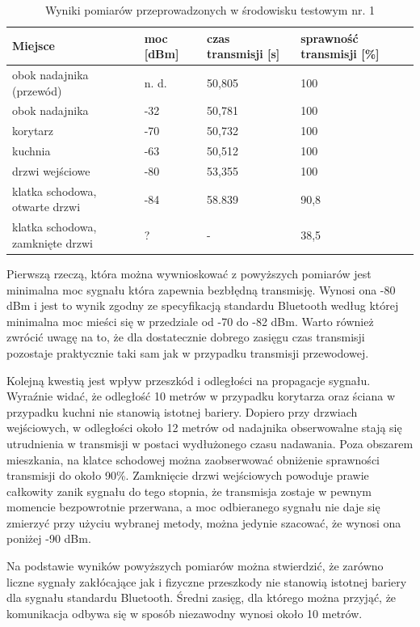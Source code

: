 \documentclass[12pt, twoside, openany]{mwrep}
\begin{document}
\begin{table}[H]
\centering
\begin{tabular}{|l|l|l|l|}
\hline
Miejsce                          & moc {[}dBm{]} & czas transmisji {[}s{]} & sprawność transmisji {[}\%{]} \\ \hline
obok nadajnika (przewód)         & n. d.         & 50,805                  & 100                           \\ \hline
obok nadajnika                   & -32           & 50,781                  & 100                           \\ \hline
korytarz                         & -70           & 50,732                  & 100                           \\ \hline
kuchnia                          & -63           & 50,512                  & 100                           \\ \hline
drzwi wejściowe                  & -80           & 53,355                  & 100                           \\ \hline
klatka schodowa, otwarte drzwi   & -84           & 58.839                  & 90,8                          \\ \hline
klatka schodowa, zamknięte drzwi & ?             & -                       & 38,5                          \\ \hline
\end{tabular}
\caption{Wyniki pomiarów przeprowadzonych w środowisku testowym nr. 1}
\end{table}
\par
Pierwszą rzeczą, która można wywnioskować z powyższych pomiarów jest minimalna moc sygnału która zapewnia bezbłędną transmisję. Wynosi ona -80 dBm i jest to wynik zgodny ze specyfikacją standardu Bluetooth według której minimalna moc mieści się w przedziale od -70 do -82 dBm.  Warto również zwrócić uwagę na to, że dla dostatecznie dobrego zasięgu czas transmisji pozostaje praktycznie taki sam jak w przypadku transmisji przewodowej. 
\par
Kolejną kwestią jest wpływ przeszkód i odległości na propagacje sygnału. Wyraźnie widać, że odległość 10 metrów w przypadku korytarza oraz ściana w przypadku kuchni nie stanowią istotnej bariery. Dopiero przy drzwiach wejściowych, w odległości około 12 metrów od nadajnika obserwowalne stają się utrudnienia w transmisji w postaci wydłużonego czasu nadawania. Poza obszarem mieszkania, na klatce schodowej można zaobserwować obniżenie sprawności transmisji do około 90\%. Zamknięcie drzwi wejściowych powoduje prawie całkowity zanik sygnału do tego stopnia, że transmisja zostaje w pewnym momencie bezpowrotnie przerwana, a moc odbieranego sygnału nie daje się zmierzyć przy użyciu wybranej metody, można jedynie szacować, że wynosi ona poniżej -90 dBm.
\par
Na podstawie wyników powyższych pomiarów można stwierdzić, że zarówno liczne sygnały zakłócające jak i fizyczne przeszkody nie stanowią istotnej bariery dla sygnału standardu Bluetooth. Średni zasięg, dla którego można przyjąć, że komunikacja odbywa się w sposób niezawodny wynosi około 10 metrów.
\end{document}
